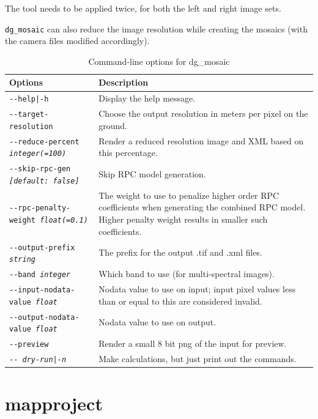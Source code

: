 The tool needs to be applied twice, for both the left and right image sets.

\texttt{dg\_mosaic} can also reduce the image resolution while creating the
mosaics (with the camera files modified accordingly).


\begin{longtable}{|l|p{10cm}|}
\caption{Command-line options for dg\_mosaic}
\label{tbl:dgmosaic}
\endfirsthead
\endhead
\endfoot
\endlastfoot
\hline
Options & Description \\ \hline \hline
\texttt{-\/-help|-h} & Display the help message.\\ \hline
\texttt{-\/-target-resolution} &
Choose the output resolution in meters per pixel on the ground. \\ \hline
\texttt{-\/-reduce-percent \textit{integer(=100)}} &
Render a reduced resolution image and XML based on this percentage. \\ \hline
\texttt{-\/-skip-rpc-gen \textit{[default: false]}} &
Skip RPC model generation.\\ \hline
\texttt{-\/-rpc-penalty-weight \textit{float(=0.1)}} &
The weight to use to penalize higher order RPC coefficients when generating the combined RPC model. Higher penalty weight results in smaller such coefficients.\\ \hline
\texttt{-\/-output-prefix \textit{string}} & The prefix for the output .tif and .xml files. \\ \hline
\texttt{-\/-band \textit{integer}} & Which band to use (for multi-spectral images). \\ \hline
\texttt{-\/-input-nodata-value \textit{float}} & Nodata value to use on input; input pixel values less than or equal to this are considered invalid. \\ \hline
\texttt{-\/-output-nodata-value \textit{float}} & Nodata value to use on output. \\ \hline

\texttt{-\/-preview } & Render a small 8 bit png of the input for preview. \\ \hline
\texttt{-\/- \textit{dry-run|-n}} & Make calculations, but just print out the commands. \\ \hline
\end{longtable}

\clearpage

\section{mapproject}
\label{mapproject}

